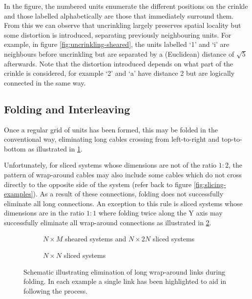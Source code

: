 			In the figure, the numbered units enumerate the different positions on
			the crinkle and those labelled alphabetically are those that immediately
			surround them. From this we can observe that uncrinkling largely
			preserves spatial locality but some distortion is introduced, separating
			previously neighbouring units. For example, in figure
			\ref{fig:uncrinkling-sheared}, the units labelled `1' and `i' are
			neighbours before uncrinkling but are separated by a (Euclidean) distance
			of $\sqrt{5}$ afterwards. Note that the distortion introduced depends on
			what part of the crinkle is considered, for example `2' and `a' have
			distance 2 but are logically connected in the same way.
		
		\subsection{Folding and Interleaving}
			
			Once a regular grid of units has been formed, this may be folded in the
			conventional way, eliminating long cables crossing from left-to-right and
			top-to-bottom as illustrated in \ref{fig:folding-sheared}.
			
			Unfortunately, for sliced systems whose dimensions are not of the ratio
			$1:2$, the pattern of wrap-around cables may also include some cables
			which do not cross directly to the opposite side of the system (refer
			back to figure \ref{fig:slicing-examples}). As a result of these
			connections, folding does not successfully eliminate all long
			connections. An exception to this rule is sliced systems whose dimensions
			are in the ratio $1:1$ where folding twice along the Y axis may
			successfully eliminate all wrap-around connections as illustrated in
			\ref{fig:folding-sliced}.
			
			\begin{figure}
				\begin{subfigure}{\linewidth}
					\center
					\caption{$N \times M$ sheared systems and $N \times 2N$ sliced systems}
					\label{fig:folding-sheared}
				\end{subfigure}
				
				\vspace{1em}
				
				\begin{subfigure}{\linewidth}
					\center
					\caption{$N \times N$ sliced systems}
					\label{fig:folding-sliced}
				\end{subfigure}
				
				\caption{Schematic illustrating elimination of long wrap-around links
				during folding. In each example a single link has been highlighted to
				aid in following the process.}
				\label{fig:folding}
			\end{figure}
			
